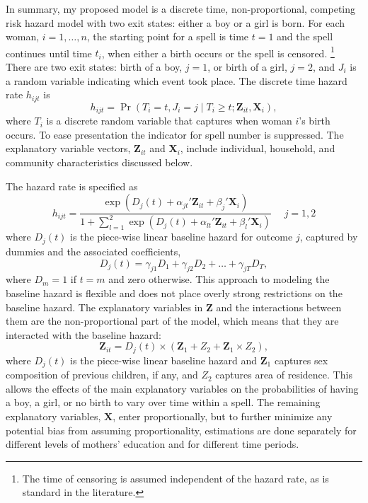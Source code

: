 \documentclass[12pt,letterpaper]{article}
\begin{document}
In summary, my proposed model is a discrete time, non-proportional, competing risk 
hazard model with two exit states: either a boy or a girl is born.
For each woman, $i=1,\ldots,n$, the starting point for a spell is time $t=1$ and 
the spell continues until time $t_i$, when either a birth occurs or the spell 
is censored.%
\footnote{
The time of censoring is assumed independent of the hazard rate,
as is standard in the literature.
}
There are two exit states: birth of a boy, $j=1$, or birth of a girl, $j=2$, and 
$J_i$ is a random variable indicating which event took place.
The discrete time hazard rate $h_{ijt}$ is
\begin{equation}
 h_{ijt} = \Pr (T_i=t, J_i=j \mid T_i \geq t; \mathbf{Z}_{it},\mathbf{X}_{i} ),
\end{equation}
where $T_i$ is a discrete random variable that captures when woman $i$'s birth occurs.
To ease presentation the indicator for spell number is suppressed.
The explanatory variable vectors, $\mathbf{Z}_{it}$ and $\mathbf{X}_{i}$, include 
individual, household, and community characteristics discussed below.

The hazard rate is specified as
\begin{equation}
 h_{ijt} = \frac{\exp(D_j(t) + \alpha_{jt}'\mathbf{Z}_{it} + \beta_j'\mathbf{X}_{i})} 
 {1 + \sum_{l=1}^2 \exp(D_j(t) + \alpha_{lt}'\mathbf{Z}_{it} + \beta_l'\mathbf{X}_{i})} \: \: \; \; \;  j = 1,2
 \label{eq:hazard}
\end{equation}
where $D_{j}(t)$ is the piece-wise linear baseline hazard for outcome $j$, captured
by dummies and the associated coefficients,
\begin{equation}
D_j(t) = \gamma_{j1} D_1 + \gamma_{j2} D_2 + \ldots + \gamma_{jT} D_T,
\end{equation}
where $D_m = 1$ if $t=m$ and zero otherwise.
This approach to modeling the baseline hazard is flexible and does not place 
overly strong restrictions on the baseline hazard.
The explanatory variables in $\mathbf{Z}$ and the interactions between them 
are the non-proportional part of the model, which means that they are
interacted with the baseline hazard:
\begin{equation}
 \mathbf{Z}_{it} = D_j(t) \times (\mathbf{Z}_1 + Z_2 + \mathbf{Z}_1 \times Z_2),
\end{equation}
where $D_j(t)$ is the piece-wise linear baseline hazard and $\mathbf{Z}_1$ captures sex 
composition of previous children, if any, and $Z_2$ captures area of residence.
This allows the effects of the main explanatory variables on the probabilities 
of having a boy, a girl, or no birth to vary over time within a spell.
The remaining explanatory variables, $\mathbf{X}$, enter proportionally,
but to further minimize any potential bias from assuming proportionality, estimations 
are done separately for different levels of mothers' education and for different 
time periods.
\end{document}
